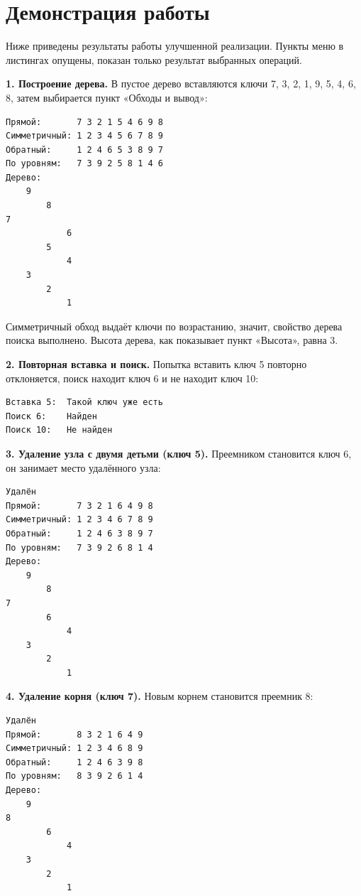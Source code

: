 \documentclass[otchet]{SCWorks}
\begin{document}
\section{Демонстрация работы}
\label{sec:demo}

Ниже приведены результаты работы улучшенной реализации. Пункты меню в
листингах опущены, показан только результат выбранных операций.

\textbf{1. Построение дерева.} В пустое дерево вставляются ключи
7, 3, 2, 1, 9, 5, 4, 6, 8, затем выбирается пункт «Обходы и вывод»:

\begin{Verbatim}[fontsize=\small]
Прямой:       7 3 2 1 5 4 6 9 8
Симметричный: 1 2 3 4 5 6 7 8 9
Обратный:     1 2 4 6 5 3 8 9 7
По уровням:   7 3 9 2 5 8 1 4 6
Дерево:
    9
        8
7
            6
        5
            4
    3
        2
            1
\end{Verbatim}

Симметричный обход выдаёт ключи по возрастанию, значит, свойство дерева
поиска выполнено. Высота дерева, как показывает пункт «Высота», равна 3.

\textbf{2. Повторная вставка и поиск.} Попытка вставить ключ 5 повторно
отклоняется, поиск находит ключ 6 и не находит ключ 10:

\begin{Verbatim}[fontsize=\small]
Вставка 5:  Такой ключ уже есть
Поиск 6:    Найден
Поиск 10:   Не найден
\end{Verbatim}

\textbf{3. Удаление узла с двумя детьми (ключ 5).} Преемником становится
ключ 6, он занимает место удалённого узла:

\begin{Verbatim}[fontsize=\small]
Удалён
Прямой:       7 3 2 1 6 4 9 8
Симметричный: 1 2 3 4 6 7 8 9
Обратный:     1 2 4 6 3 8 9 7
По уровням:   7 3 9 2 6 8 1 4
Дерево:
    9
        8
7
        6
            4
    3
        2
            1
\end{Verbatim}

\textbf{4. Удаление корня (ключ 7).} Новым корнем становится преемник 8:

\begin{Verbatim}[fontsize=\small]
Удалён
Прямой:       8 3 2 1 6 4 9
Симметричный: 1 2 3 4 6 8 9
Обратный:     1 2 4 6 3 9 8
По уровням:   8 3 9 2 6 1 4
Дерево:
    9
8
        6
            4
    3
        2
            1
\end{Verbatim}
\end{document}
